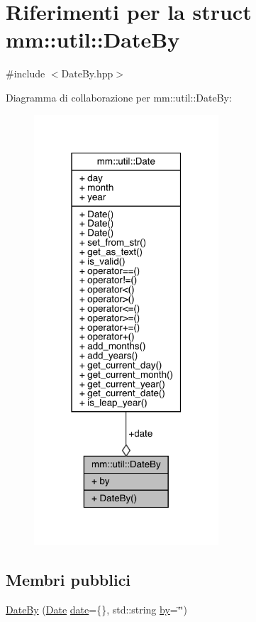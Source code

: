 \hypertarget{structmm_1_1util_1_1_date_by}{}\section{Riferimenti per la struct mm\+:\+:util\+:\+:Date\+By}
\label{structmm_1_1util_1_1_date_by}


{\ttfamily \#include $<$Date\+By.\+hpp$>$}



Diagramma di collaborazione per mm\+:\+:util\+:\+:Date\+By\+:
\nopagebreak
\begin{figure}[H]
\begin{center}
\leavevmode
\includegraphics[width=195pt]{d2/d03/structmm_1_1util_1_1_date_by__coll__graph}
\end{center}
\end{figure}
\subsection*{Membri pubblici}
\begin{DoxyCompactItemize}
\item 
\mbox{\hyperlink{structmm_1_1util_1_1_date_by_a2e30c048476714b88489a1a90a1f976c}{Date\+By}} (\mbox{\hyperlink{structmm_1_1util_1_1_date}{Date}} \mbox{\hyperlink{structmm_1_1util_1_1_date_by_a4adb77c6560794be119e39b374498b68}{date}}=\{\}, std\+::string \mbox{\hyperlink{structmm_1_1util_1_1_date_by_ae431f5029222a6ec9293c4c4564834f3}{by}}=\char`\"{}\char`\"{})
\end{DoxyCompactItemize}
